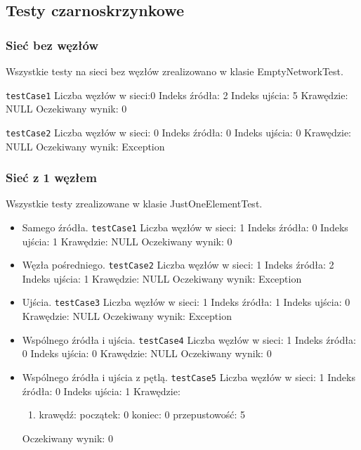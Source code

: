 \subsection{Testy czarno\dywiz skrzynkowe}



\subsubsection{Sieć bez węzłów}
Wszystkie testy na sieci bez węzłów zrealizowano w klasie EmptyNetworkTest.

\texttt{testCase1}
Liczba węzłów w sieci:0
Indeks źródła: 2
Indeks ujścia: 5
Krawędzie: NULL
Oczekiwany wynik: 0

\texttt{testCase2}
Liczba węzłów w sieci: 0
Indeks źródła: 0
Indeks ujścia: 0
Krawędzie: NULL
Oczekiwany wynik: Exception

\subsubsection{Sieć z 1 węzłem}
Wszystkie testy zrealizowane w klasie JustOneElementTest.
\begin{itemize}[nosep]
    \item Samego źródła.
    \texttt{testCase1}
    Liczba węzłów w sieci: 1
    Indeks źródła: 0
    Indeks ujścia: 1
    Krawędzie: NULL
    Oczekiwany wynik: 0

    \item Węzła pośredniego.
    \texttt{testCase2}
    Liczba węzłów w sieci: 1
    Indeks źródła: 2
    Indeks ujścia: 1
    Krawędzie: NULL
    Oczekiwany wynik: Exception

    \item Ujścia.
    \texttt{testCase3}
    Liczba węzłów w sieci: 1
    Indeks źródła: 1
    Indeks ujścia: 0
    Krawędzie: NULL
    Oczekiwany wynik: Exception

    \item Wspólnego źródła i ujścia.
    \texttt{testCase4}
    Liczba węzłów w sieci: 1
    Indeks źródła: 0
    Indeks ujścia: 0
    Krawędzie: NULL
    Oczekiwany wynik: 0

    \item Wspólnego źródła i ujścia z pętlą.
    \texttt{testCase5}
    Liczba węzłów w sieci: 1
    Indeks źródła: 0
    Indeks ujścia: 1
    Krawędzie:
    \begin{enumerate}[nosep]
        \item krawędź:
        początek: 0
        koniec: 0
        przepustowość: 5
    \end{enumerate}
    Oczekiwany wynik: 0

\end{itemize}


